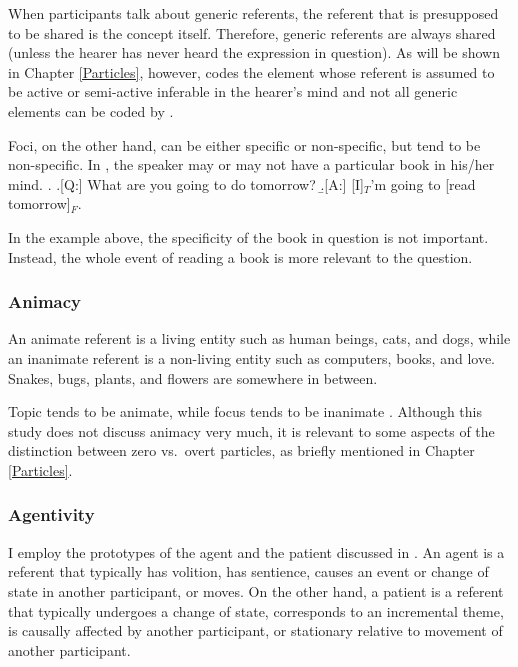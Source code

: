 When participants talk about generic referents,
the referent that is presupposed to be shared is the concept itself.
Therefore, generic referents are always shared
(unless the hearer has never heard the expression in question).
As will be shown in Chapter \ref{Particles}, however,
 codes the element whose referent is assumed to be active or semi-active inferable in the hearer's mind and
not all generic elements can be coded by .


Foci, on the other hand, can be either specific or non-specific,
but tend to be non-specific.
In \Next[A],
the speaker may or may not have a particular book in his/her mind.
%
\ex. \a.[Q:] What are you going to do tomorrow?
	\b.[A:] [I]$_{T}$'m going to [read  tomorrow]$_{F}$.

In the example above,
the specificity of the book in question is not important.
Instead, the whole event of reading a book is more relevant to the question.



\subsubsection{Animacy}

An animate referent is a living entity such as human beings, cats, and dogs,
while an inanimate referent is a non-living entity such as computers, books, and love.
Snakes, bugs, plants, and flowers are somewhere in between.

Topic tends to be animate,
while focus tends to be inanimate \cite{givon76,keenan76,comrie79,comrie83,dubois87}.
Although this study does not discuss animacy very much,
it is relevant to some aspects of the distinction between
zero vs.\ overt particles,
as briefly mentioned in Chapter \ref{Particles}.


\subsubsection{Agentivity}

I employ the prototypes of the agent and the patient
discussed in .
An agent is a referent
that typically has volition,
has sentience,
causes an event or change of state in another participant, or
moves.
On the other hand,
a patient is a referent
that typically undergoes a change of state,
corresponds to an incremental theme,
is causally affected by another participant, or
stationary relative to movement of another participant.

